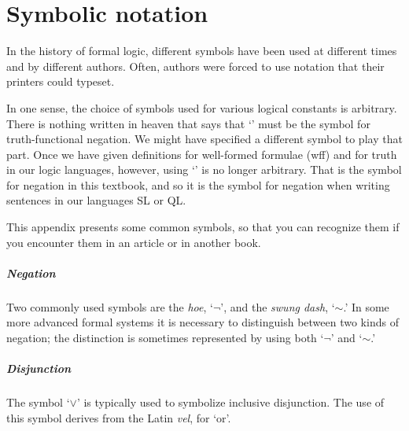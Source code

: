 \chapter[Other symbolic notation]{Symbolic notation}
\label{app.notation}

In the history of formal logic, different symbols have been used at different times and by different authors. Often, authors were forced to use notation that their printers could typeset.

In one sense, the choice of symbols used for various logical constants is arbitrary. There is nothing written in heaven that says that `\enot' must be the symbol for truth-functional negation. We might have specified a different symbol to play that part. Once we have given definitions for well-formed formulae (wff) and for truth in our logic languages, however, using `\enot' is no longer arbitrary. That is the symbol for negation in this textbook, and so it is the symbol for negation when writing sentences in our languages SL or QL.

This appendix presents some common symbols, so that you can recognize them if you encounter them in an article or in another book.

\paragraph{Negation} Two commonly used symbols are the \emph{hoe}, `$\neg$', and the \emph{swung dash}, `${\sim}$.' In some more advanced formal systems it is necessary to distinguish between two kinds of negation; the distinction is sometimes represented by using both `$\neg$' and `${\sim}$.'

\paragraph{Disjunction} The symbol `$\vee$' is typically used to symbolize inclusive disjunction. The use of this symbol derives from the Latin \emph{vel}, for `or'.

